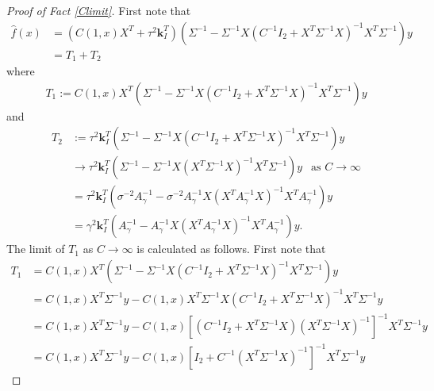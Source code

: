 \documentclass{scrartcl}
\begin{document}
\begin{proof}[Proof of Fact \ref{Climit}]
  First note that
\begin{align*}
  \hat{f}(x)  &= \left(C (1, x) X^T + \tau^2 \mathbf{k}_I^T \right)
                \left(\Sigma^{-1} - \Sigma^{-1} X \left(C^{-1} 
                            I_2 + X^T \Sigma^{-1} X  \right)^{-1} X^T
                \Sigma^{-1} \right) y \\
  &= T_1 + T_2
\end{align*}
where
\begin{align*}
  T_1 := C (1, x) X^T\left(\Sigma^{-1} - \Sigma^{-1} X \left(C^{-1} 
                            I_2 + X^T \Sigma^{-1} X  \right)^{-1} X^T
                \Sigma^{-1} \right) y
\end{align*}
and
\begin{align*}
  T_2 &:= \tau^2 \mathbf{k}_I^T 
                \left(\Sigma^{-1} - \Sigma^{-1} X \left(C^{-1} 
                            I_2 + X^T \Sigma^{-1} X  \right)^{-1} X^T
        \Sigma^{-1} \right) y \\
  &\rightarrow \tau^2 \mathbf{k}_I^T 
                \left(\Sigma^{-1} - \Sigma^{-1} X \left(X^T
    \Sigma^{-1} X  \right)^{-1} X^T 
    \Sigma^{-1} \right) y ~~ \text{ as $C \rightarrow \infty$} \\
  &= \tau^2 \mathbf{k}_I^T \left(\sigma^{-2} A_{\gamma}^{-1} -
    \sigma^{-2}A_{\gamma}^{-1} X \left(X^T 
    A_{\gamma}^{-1} X  \right)^{-1} X^T 
    A_{\gamma}^{-1} \right) y \\
  &= \gamma^2 \mathbf{k}_I^T \left(A_{\gamma}^{-1} -
A_{\gamma}^{-1} X \left(X^T 
    A_{\gamma}^{-1} X  \right)^{-1} X^T 
    A_{\gamma}^{-1} \right) y. 
\end{align*}
The limit of $T_1$ as $C \rightarrow \infty$ is calculated as
follows. First note that
\begin{align*}
  T_1 &= C (1, x) X^T\left(\Sigma^{-1} - \Sigma^{-1} X \left(C^{-1} 
                            I_2 + X^T \Sigma^{-1} X  \right)^{-1} X^T
        \Sigma^{-1} \right) y \\
  &= C(1, x) X^T \Sigma^{-1} y - C (1, x) X^T \Sigma^{-1} X\left(C^{-1} 
                            I_2 + X^T \Sigma^{-1} X  \right)^{-1} X^T
    \Sigma^{-1} y \\
  &= C(1, x) X^T \Sigma^{-1} y - C(1, x) \left[\left(C^{-1} I_2 + X^T
    \Sigma^{-1} X \right) (X^T \Sigma^{-1} X)^{-1} \right]^{-1}   X^T
    \Sigma^{-1} y \\
  &= C(1, x) X^T \Sigma^{-1} y - C(1, x) \left[I_2 + C^{-1} (X^T
    \Sigma^{-1} X)^{-1}  \right]^{-1} X^T \Sigma^{-1} y

\end{align*}
\end{proof}
\end{document}
